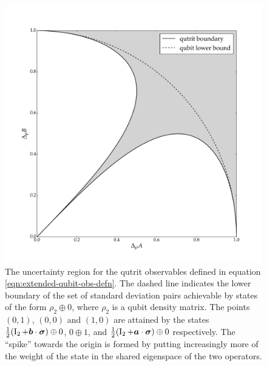 \begin{center}
  \begin{figure}[ht]
    \includegraphics[width=\textwidth]{figs/extended-qubit-error-region-bw}
    \caption[The uncertainty region for the qutrit observables defined in equation \eqref{eqn:extended-qubit-obs-defn}]{The uncertainty region for the qutrit observables defined in equation \eqref{eqn:extended-qubit-obs-defn}. The dashed line indicates the lower boundary of the set of standard deviation pairs achievable by states of the form $\rho_2 \oplus 0$, where $\rho_2$ is a qubit density matrix. The points $(0,1)$, $(0,0)$ and $(1,0)$ are attained by the states $\frac{1}{2}(\operatorname{I}_2+\bm{b}\cdot{\boldsymbol\sigma})\oplus 0$, $0\oplus 1$, and $\frac{1}{2}(\operatorname{I}_2+\bm{a}\cdot{\boldsymbol\sigma})\oplus 0$ respectively. The ``spike'' towards the origin is formed by putting increasingly more of the weight of the state in the shared eigenspace of the two operators.}
    \label{fig:extended-qubit-uncertainty-region}
  \end{figure}
\end{center}


